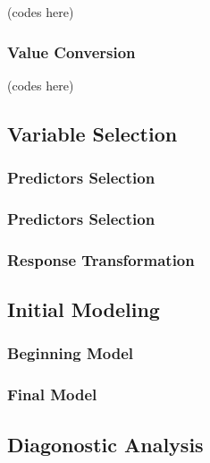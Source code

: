 \documentclass[
  twocolumn]{article}
\begin{document}
(codes here)

\hypertarget{value-conversion-1}{%
\subsubsection{Value Conversion}\label{value-conversion-1}}

(codes here)

\hypertarget{variable-selection-1}{%
\subsection{Variable Selection}\label{variable-selection-1}}

\hypertarget{predictors-selection}{%
\subsubsection{Predictors Selection}\label{predictors-selection}}

\hypertarget{predictors-selection-1}{%
\subsubsection{Predictors Selection}\label{predictors-selection-1}}

\hypertarget{response-transformation-1}{%
\subsubsection{Response
Transformation}\label{response-transformation-1}}

\hypertarget{initial-modeling-1}{%
\subsection{Initial Modeling}\label{initial-modeling-1}}

\hypertarget{beginning-model}{%
\subsubsection{Beginning Model}\label{beginning-model}}

\hypertarget{final-model}{%
\subsubsection{Final Model}\label{final-model}}

\hypertarget{diagonostic-analysis-1}{%
\subsection{Diagonostic Analysis}\label{diagonostic-analysis-1}}
\end{document}
